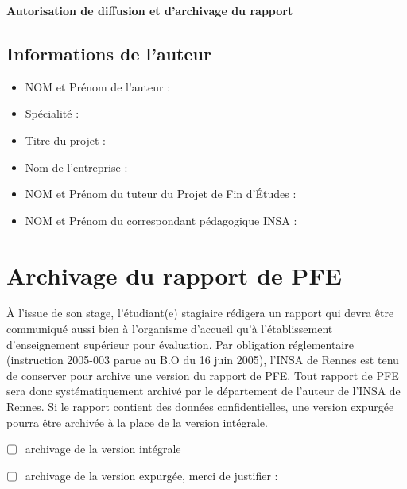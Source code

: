 \begin{center}
\textbf{\LARGE Autorisation de diffusion et d’archivage du rapport}
\end{center}

\subsection*{Informations de l’auteur}
\begin{itemize}[label={--}]
    \item NOM et Prénom de l’auteur : \underline{\hspace{5cm}}
    \item Spécialité : \underline{\hspace{5cm}}
    \item Titre du projet : \underline{\hspace{5cm}}
    \item Nom de l’entreprise : \underline{\hspace{5cm}}
    \item NOM et Prénom du tuteur du Projet de Fin d'Études : \underline{\hspace{5cm}}
    \item NOM et Prénom du correspondant pédagogique INSA : \underline{\hspace{5cm}}
\end{itemize}

\section*{Archivage du rapport de PFE}
À l'issue de son stage, l'étudiant(e) stagiaire rédigera un rapport qui devra être communiqué aussi bien à l'organisme d'accueil qu'à l'établissement d'enseignement supérieur pour évaluation.  
Par obligation réglementaire (instruction 2005-003 parue au B.O du 16 juin 2005), l’INSA de Rennes est tenu de conserver pour archive une version du rapport de PFE. Tout rapport de PFE sera donc systématiquement archivé par le département de l'auteur de l’INSA de Rennes.   
Si le rapport contient des données confidentielles, une version expurgée pourra être archivée à la place de la version intégrale.

\begin{itemize}
    \item ☐ archivage de la version intégrale
    \item ☐ archivage de la version expurgée, merci de justifier : \underline{\hspace{5cm}}
\end{itemize}

